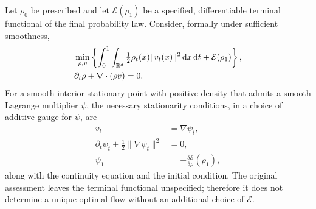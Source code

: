 \documentclass[12pt,a4paper,oneside]{book}
\begin{document}
\begin{proposition}
\label{prop:kinetic-control}
\label{src:p9q15}
Let $\rho_0$ be prescribed and let $\mathcal E(\rho_1)$ be a specified,
differentiable terminal functional of the final probability law.
Consider, formally under sufficient smoothness,
\begin{equation*}
\begin{aligned}
&\min_{\rho,v}\left\{
\int_0^1\int_{\mathbb{R}^d}\tfrac12\rho_t(x)\|v_t(x)\|^2\,\mathrm{d} x\,\mathrm{d} t
+\mathcal E(\rho_1)\right\},\\
&\partial_t\rho+\nabla\cdot(\rho v)=0.
\end{aligned}
\end{equation*}
For a smooth interior stationary point with positive density that
admits a smooth Lagrange multiplier $\psi$, the necessary stationarity
conditions, in a choice of additive gauge for $\psi$, are
\begin{equation*}
\begin{aligned}
v_t&=\nabla\psi_t,\\
\partial_t\psi_t+\tfrac12\|\nabla\psi_t\|^2&=0,
\\
\psi_1&=-\frac{\delta\mathcal E}{\delta\rho}(\rho_1),
\end{aligned}
\end{equation*}
along with the continuity equation and the initial condition.
The original assessment leaves the terminal functional unspecified;
therefore it does not determine a unique optimal flow without an
additional choice of $\mathcal E$.
\end{proposition}
\end{document}
